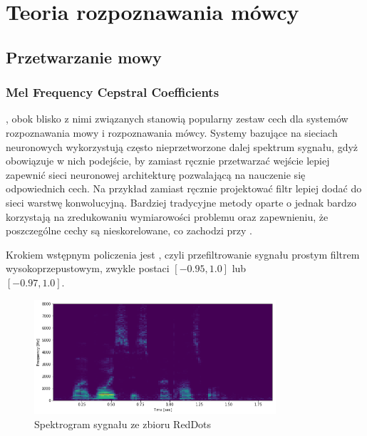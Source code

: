 \chapter{Teoria rozpoznawania mówcy}\label{chap:teoria}

\section{Przetwarzanie mowy}\label{sec:przetwarzanie_mowy}

\subsection{Mel Frequency Cepstral Coefficients}\label{sec:mfcc}

, obok blisko z nimi związanych  stanowią popularny zestaw
cech dla systemów rozpoznawania mowy i rozpoznawania mówcy. Systemy bazujące na sieciach
neuronowych wykorzystują często nieprzetworzone dalej spektrum sygnału, gdyż obowiązuje
w nich podejście, by zamiast ręcznie przetwarzać wejście lepiej zapewnić sieci neuronowej
architekturę pozwalającą na nauczenie się odpowiednich cech. Na przykład zamiast ręcznie
projektować filtr lepiej dodać do sieci warstwę konwolucyjną. Bardziej tradycyjne metody
oparte o  jednak bardzo korzystają na zredukowaniu wymiarowości problemu
oraz zapewnieniu, że poszczególne cechy są nieskorelowane, co zachodzi przy .

Krokiem wstępnym policzenia  jest , czyli przefiltrowanie sygnału
prostym filtrem wysokoprzepustowym, zwykle postaci $[-0.95, 1.0]$ lub \\ $[-0.97, 1.0]$.

\begin{figure}[H]
    \centering
    \includegraphics[width=0.8\textwidth]{images/2_1_a_example_spectrogram}
    \caption{Spektrogram sygnału  ze zbioru RedDots}
    \label{fig:2_1_a_example_spectrogram}
\end{figure}

